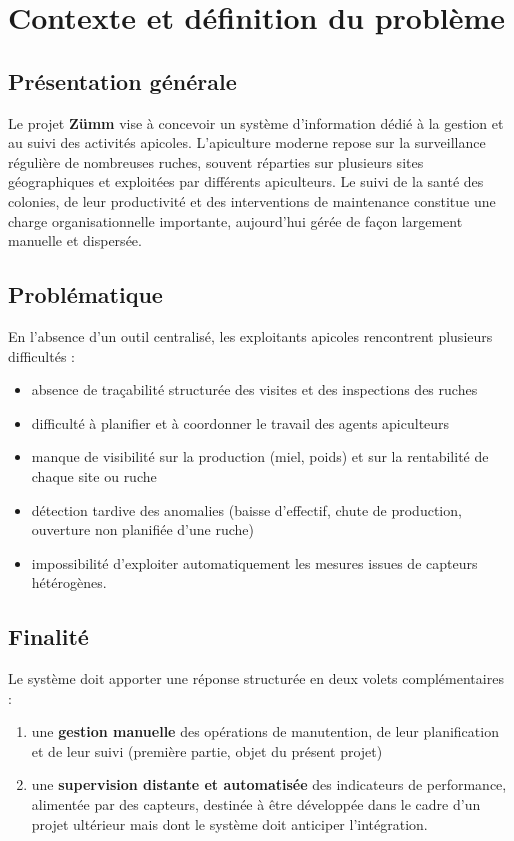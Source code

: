 \chapter{Contexte et définition du problème}

\section{Présentation générale}
Le projet \textbf{Zümm} vise à concevoir un système d'information
dédié à la gestion et au suivi des activités apicoles. L'apiculture moderne
repose sur la surveillance régulière de nombreuses ruches, souvent réparties
sur plusieurs sites géographiques et exploitées par différents apiculteurs.
Le suivi de la santé des colonies, de leur productivité et des interventions
de maintenance constitue une charge organisationnelle importante, aujourd'hui
gérée de façon largement manuelle et dispersée.

\section{Problématique}
En l'absence d'un outil centralisé, les exploitants apicoles rencontrent
plusieurs difficultés :
\begin{itemize}
  \item absence de traçabilité structurée des visites et des inspections des ruches
  \item difficulté à planifier et à coordonner le travail des agents apiculteurs
  \item manque de visibilité sur la production (miel, poids) et sur la rentabilité de chaque site ou ruche
  \item détection tardive des anomalies (baisse d'effectif, chute de production, ouverture non planifiée d'une ruche)
  \item impossibilité d'exploiter automatiquement les mesures issues de capteurs hétérogènes.
\end{itemize}

\section{Finalité}
Le système doit apporter une réponse structurée en deux volets complémentaires :
\begin{enumerate}
  \item une \textbf{gestion manuelle} des opérations de manutention, de leur
        planification et de leur suivi (première partie, objet du présent projet)
  \item une \textbf{supervision distante et automatisée} des indicateurs de
        performance, alimentée par des capteurs, destinée à être développée dans
        le cadre d'un projet ultérieur mais dont le système doit anticiper
        l'intégration.
\end{enumerate}

